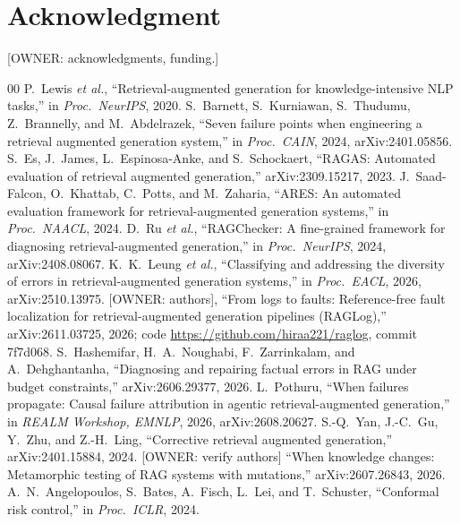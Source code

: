 \documentclass[conference]{IEEEtran}
\begin{document}
\section*{Acknowledgment}
[OWNER: acknowledgments, funding.]

\begin{thebibliography}{00}
 P.~Lewis \emph{et al.}, ``Retrieval-augmented generation for knowledge-intensive NLP tasks,'' in \emph{Proc.\ NeurIPS}, 2020.
 S.~Barnett, S.~Kurniawan, S.~Thudumu, Z.~Brannelly, and M.~Abdelrazek, ``Seven failure points when engineering a retrieval augmented generation system,'' in \emph{Proc.\ CAIN}, 2024, arXiv:2401.05856.
 S.~Es, J.~James, L.~Espinosa-Anke, and S.~Schockaert, ``RAGAS: Automated evaluation of retrieval augmented generation,'' arXiv:2309.15217, 2023.
 J.~Saad-Falcon, O.~Khattab, C.~Potts, and M.~Zaharia, ``ARES: An automated evaluation framework for retrieval-augmented generation systems,'' in \emph{Proc.\ NAACL}, 2024.
 D.~Ru \emph{et al.}, ``RAGChecker: A fine-grained framework for diagnosing retrieval-augmented generation,'' in \emph{Proc.\ NeurIPS}, 2024, arXiv:2408.08067.
 K.~K.~Leung \emph{et al.}, ``Classifying and addressing the diversity of errors in retrieval-augmented generation systems,'' in \emph{Proc.\ EACL}, 2026, arXiv:2510.13975.
 [OWNER: authors], ``From logs to faults: Reference-free fault localization for retrieval-augmented generation pipelines (RAGLog),'' arXiv:2611.03725, 2026; code \url{https://github.com/hiraa221/raglog}, commit 7f7d068.
 S.~Hashemifar, H.~A.~Noughabi, F.~Zarrinkalam, and A.~Dehghantanha, ``Diagnosing and repairing factual errors in RAG under budget constraints,'' arXiv:2606.29377, 2026.
 L.~Pothuru, ``When failures propagate: Causal failure attribution in agentic retrieval-augmented generation,'' in \emph{REALM Workshop, EMNLP}, 2026, arXiv:2608.20627.
 S.-Q.~Yan, J.-C.~Gu, Y.~Zhu, and Z.-H.~Ling, ``Corrective retrieval augmented generation,'' arXiv:2401.15884, 2024.
 [OWNER: verify authors] ``When knowledge changes: Metamorphic testing of RAG systems with mutations,'' arXiv:2607.26843, 2026.
 A.~N.~Angelopoulos, S.~Bates, A.~Fisch, L.~Lei, and T.~Schuster, ``Conformal risk control,'' in \emph{Proc.\ ICLR}, 2024.

\end{thebibliography}
\end{document}
